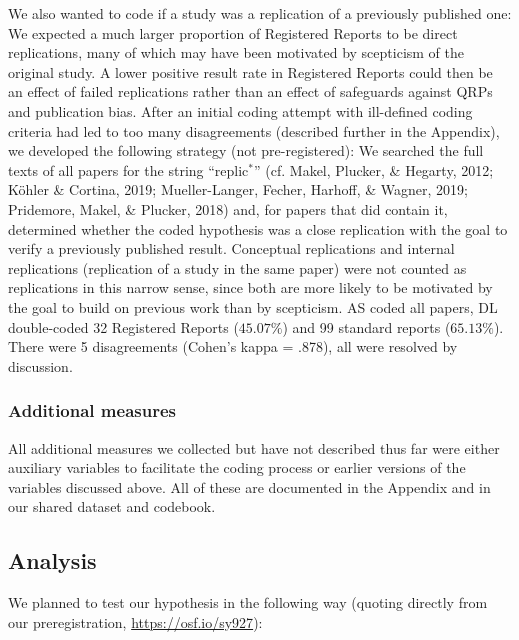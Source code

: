 \documentclass[british,,jou,floatsintext]{apa6}
\begin{document}
We also wanted to code if a study was a replication of a previously published one:
We expected a much larger proportion of Registered Reports to be direct replications, many of which may have been motivated by scepticism of the original study.
A lower positive result rate in Registered Reports could then be an effect of failed replications rather than an effect of safeguards against QRPs and publication bias.
After an initial coding attempt with ill-defined coding criteria had led to too many disagreements (described further in the Appendix), we developed the following strategy (not pre-registered):
We searched the full texts of all papers for the string \enquote{replic\(^\ast\)} (cf. Makel, Plucker, \& Hegarty, 2012; Köhler \& Cortina, 2019; Mueller-Langer, Fecher, Harhoff, \& Wagner, 2019; Pridemore, Makel, \& Plucker, 2018) and, for papers that did contain it, determined whether the coded hypothesis was a close replication with the goal to verify a previously published result.
Conceptual replications and internal replications (replication of a study in the same paper) were not counted as replications in this narrow sense, since both are more likely to be motivated by the goal to build on previous work than by scepticism.
AS coded all papers, DL double-coded 32 Registered Reports (\(45.07 \%\)) and 99 standard reports (\(65.13 \%\)).
There were 5 disagreements (Cohen's kappa = .878), all were resolved by discussion.

\hypertarget{additional-measures}{%
\subsubsection{Additional measures}\label{additional-measures}}

All additional measures we collected but have not described thus far were either auxiliary variables to facilitate the coding process or earlier versions of the variables discussed above.
All of these are documented in the Appendix and in our shared dataset and codebook.

\hypertarget{analysis}{%
\subsection{Analysis}\label{analysis}}

We planned to test our hypothesis in the following way (quoting directly from our preregistration, \url{https://osf.io/sy927}):
\end{document}
